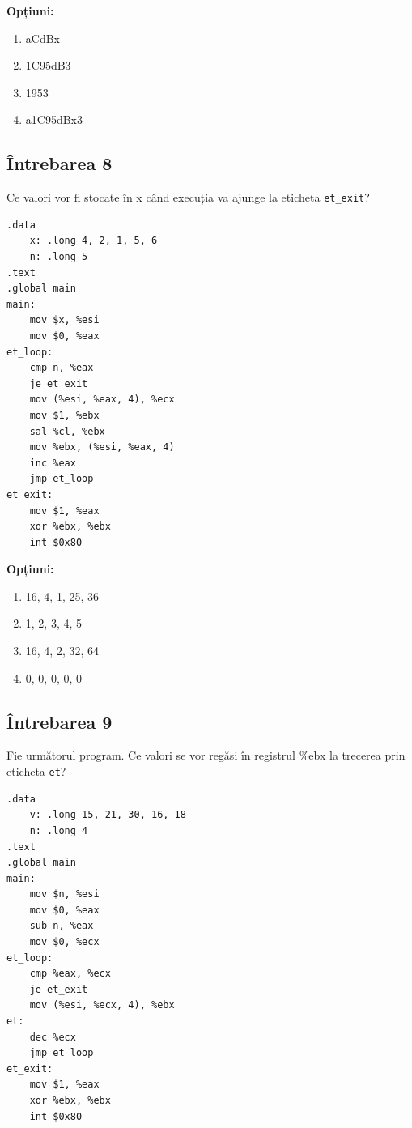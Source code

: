 \documentclass[12pt,a4paper]{article}
\begin{document}
\textbf{Opțiuni:}
\begin{multicols}{2}
\begin{enumerate}[label=\alph*)]
    \item aCdBx
    \item 1C95dB3
    \item 1953 
    \item a1C95dBx3
\end{enumerate}
\end{multicols}

\subsection*{Întrebarea 8}
Ce valori vor fi stocate în x când execuția va ajunge la eticheta \texttt{et\_exit}?
\begin{multicols}{2}
\begin{lstlisting}[language=x86asm]
.data
    x: .long 4, 2, 1, 5, 6
    n: .long 5
.text
.global main
main:
    mov $x, %esi
    mov $0, %eax
et_loop:
    cmp n, %eax
    je et_exit
    mov (%esi, %eax, 4), %ecx
    mov $1, %ebx
    sal %cl, %ebx
    mov %ebx, (%esi, %eax, 4)
    inc %eax
    jmp et_loop
et_exit:
    mov $1, %eax
    xor %ebx, %ebx
    int $0x80
\end{lstlisting}
\end{multicols}

\textbf{Opțiuni:}
\begin{multicols}{2}
\begin{enumerate}[label=\alph*)]
    \item 16, 4, 1, 25, 36
    \item 1, 2, 3, 4, 5
    \item 16, 4, 2, 32, 64 
    \item 0, 0, 0, 0, 0
\end{enumerate}
\end{multicols}
\newpage

\subsection*{Întrebarea 9}
Fie următorul program. Ce valori se vor regăsi în registrul \%ebx la trecerea prin eticheta \texttt{et}?
\begin{lstlisting}[language=x86asm]
.data
    v: .long 15, 21, 30, 16, 18
    n: .long 4
.text
.global main
main:
    mov $n, %esi
    mov $0, %eax
    sub n, %eax
    mov $0, %ecx
et_loop:
    cmp %eax, %ecx
    je et_exit
    mov (%esi, %ecx, 4), %ebx
et:
    dec %ecx
    jmp et_loop
et_exit:
    mov $1, %eax
    xor %ebx, %ebx
    int $0x80
\end{lstlisting}
\end{document}

